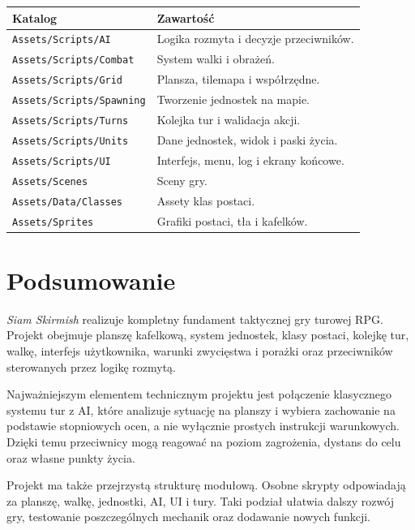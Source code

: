 \documentclass[12pt,a4paper]{article}
\begin{document}
\begin{longtable}{p{5cm} p{9cm}}
\toprule
\textbf{Katalog} & \textbf{Zawartość} \\
\midrule
\endhead
\texttt{Assets/Scripts/AI} & Logika rozmyta i decyzje przeciwników. \\[4pt]
\texttt{Assets/Scripts/Combat} & System walki i obrażeń. \\[4pt]
\texttt{Assets/Scripts/Grid} & Plansza, tilemapa i współrzędne. \\[4pt]
\texttt{Assets/Scripts/Spawning} & Tworzenie jednostek na mapie. \\[4pt]
\texttt{Assets/Scripts/Turns} & Kolejka tur i walidacja akcji. \\[4pt]
\texttt{Assets/Scripts/Units} & Dane jednostek, widok i paski życia. \\[4pt]
\texttt{Assets/Scripts/UI} & Interfejs, menu, log i ekrany końcowe. \\[4pt]
\texttt{Assets/Scenes} & Sceny gry. \\[4pt]
\texttt{Assets/Data/Classes} & Assety klas postaci. \\[4pt]
\texttt{Assets/Sprites} & Grafiki postaci, tła i kafelków. \\
\bottomrule
\end{longtable}

\newpage

\section{Podsumowanie}

\textit{Siam Skirmish} realizuje kompletny fundament taktycznej gry turowej RPG. Projekt obejmuje planszę kafelkową, system jednostek, klasy postaci, kolejkę tur, walkę, interfejs użytkownika, warunki zwycięstwa i porażki oraz przeciwników sterowanych przez logikę rozmytą.

Najważniejszym elementem technicznym projektu jest połączenie klasycznego systemu tur z AI, które analizuje sytuację na planszy i wybiera zachowanie na podstawie stopniowych ocen, a nie wyłącznie prostych instrukcji warunkowych. Dzięki temu przeciwnicy mogą reagować na poziom zagrożenia, dystans do celu oraz własne punkty życia.

Projekt ma także przejrzystą strukturę modułową. Osobne skrypty odpowiadają za planszę, walkę, jednostki, AI, UI i tury. Taki podział ułatwia dalszy rozwój gry, testowanie poszczególnych mechanik oraz dodawanie nowych funkcji.
\end{document}

